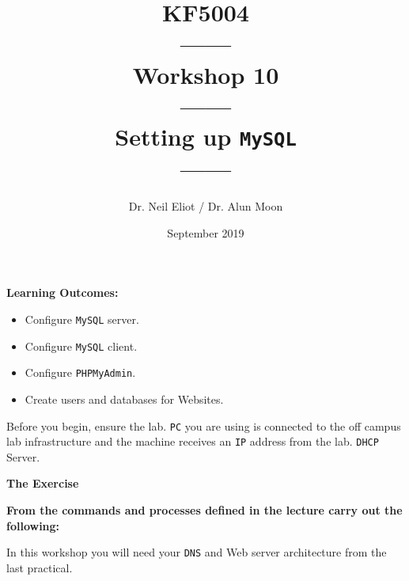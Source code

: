 \documentclass[11pt]{article}
\begin{document}
\author{Dr. Neil Eliot / Dr. Alun Moon}
\title{KF5004\\------\\Workshop 10\\------\\Setting up \texttt{MySQL}\\------}
\date{September 2019}
\maketitle

\newpage



\noindent\textbf{Learning Outcomes:}
\begin{itemize}
    \item Configure \texttt{MySQL} server.
    \item Configure \texttt{MySQL} client.
    \item Configure \texttt{PHPMyAdmin}.
    \item Create users and databases for Websites.
\end{itemize}


\begin{tcolorbox}[title={\textbf{Important:}}]
    Before you begin, ensure the lab. \texttt{PC} you are using is connected to the off campus lab infrastructure and the machine receives an \texttt{IP} address from the lab. \texttt{DHCP} Server.
\end{tcolorbox}
\newpage

\noindent\textbf{The Exercise}\\
\begin{tcolorbox}[colback=blue!20]
    \noindent\textbf{From the commands and processes defined in the lecture carry out the following:}
\end{tcolorbox}


\begin{tcolorbox}[title={\textbf{NOTE:}}]
    In this workshop you will need your \texttt{DNS} and Web server architecture from the last practical.
\end{tcolorbox}
\end{document}
